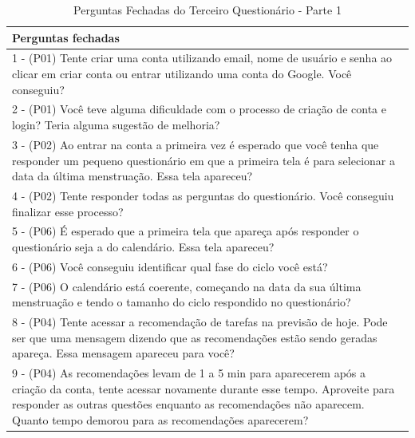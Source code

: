 \begin{table}[htbp]
    \centering
    \caption{Perguntas Fechadas do Terceiro Questionário - Parte 1}
    \label{tab15}
    \begin{tabular}{p{15cm}}
        \toprule
        \textbf{Perguntas fechadas} \\
        \midrule
        1 - (P01) Tente criar uma conta utilizando email, nome de usuário e senha ao clicar em criar conta ou entrar utilizando uma conta do Google. Você conseguiu?
         \\
        \midrule
        2 - (P01) Você teve alguma dificuldade com o processo de criação de conta e login? Teria alguma sugestão de melhoria?
        \\
        \midrule
        3 - (P02) Ao entrar na conta a primeira vez é esperado que você tenha que responder um pequeno questionário em que a primeira tela é para selecionar a data da última menstruação. Essa tela apareceu?  \\
        \midrule
        4 - (P02) Tente responder todas as perguntas do questionário. Você conseguiu finalizar esse processo?   \\
        \midrule
        5 - (P06) É esperado que a primeira tela que apareça após responder o questionário seja a do calendário. Essa tela apareceu? \\
        \midrule
        6 - (P06) Você conseguiu identificar qual fase do ciclo você está?  \\
        \midrule
        7 - (P06) O calendário está coerente, começando na data da sua última menstruação e tendo o tamanho do ciclo respondido no questionário? \\
        \midrule
        8 - (P04) Tente acessar a recomendação de tarefas na previsão de hoje. Pode ser que uma mensagem dizendo que as recomendações estão sendo geradas apareça. Essa mensagem apareceu para você? \\
        \midrule
        9 - (P04) As recomendações levam de 1 a 5 min para aparecerem após a criação da conta, tente acessar novamente durante esse tempo. Aproveite para responder as outras questões enquanto as recomendações não aparecem. Quanto tempo demorou para as recomendações aparecerem? \\
        \bottomrule
    \end{tabular}
\end{table}



